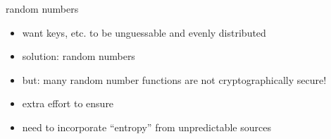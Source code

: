 \begin{frame}{random numbers}
    \begin{itemize}
    \item want keys, etc. to be unguessable and evenly distributed
    \vspace{.5cm}
    \item solution: random numbers
    \item but: many random number functions are not cryptographically secure!
    \vspace{.5cm}
    \item extra effort to ensure 
    \item need to incorporate ``entropy'' from unpredictable sources
    \end{itemize}
\end{frame}
